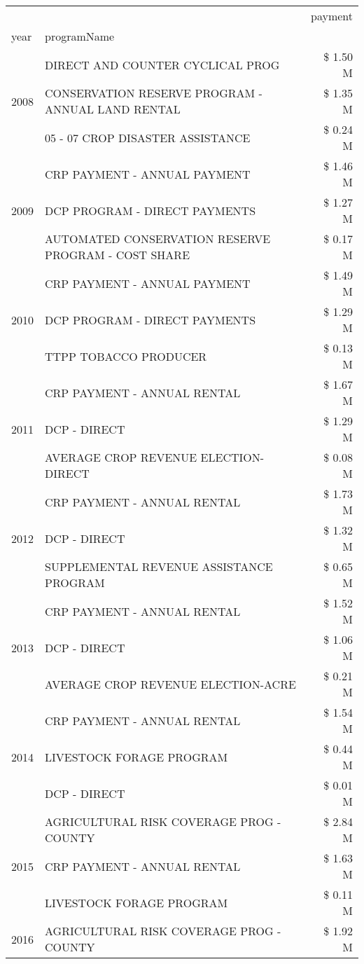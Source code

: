 \begin{tabular}{llr}
\toprule
 &  & payment \\
year & programName &  \\
\midrule
\multirow[t]{3}{*}{2008} & DIRECT AND COUNTER CYCLICAL PROG & \$ 1.50 M \\
 & CONSERVATION RESERVE PROGRAM - ANNUAL LAND RENTAL & \$ 1.35 M \\
 & 05 - 07 CROP DISASTER ASSISTANCE & \$ 0.24 M \\
\cline{1-3}
\multirow[t]{3}{*}{2009} & CRP PAYMENT - ANNUAL PAYMENT & \$ 1.46 M \\
 & DCP PROGRAM - DIRECT PAYMENTS & \$ 1.27 M \\
 & AUTOMATED CONSERVATION RESERVE PROGRAM - COST SHARE & \$ 0.17 M \\
\cline{1-3}
\multirow[t]{3}{*}{2010} & CRP PAYMENT - ANNUAL PAYMENT & \$ 1.49 M \\
 & DCP PROGRAM - DIRECT PAYMENTS & \$ 1.29 M \\
 & TTPP TOBACCO PRODUCER & \$ 0.13 M \\
\cline{1-3}
\multirow[t]{3}{*}{2011} & CRP PAYMENT - ANNUAL RENTAL & \$ 1.67 M \\
 & DCP - DIRECT & \$ 1.29 M \\
 & AVERAGE CROP REVENUE ELECTION-DIRECT & \$ 0.08 M \\
\cline{1-3}
\multirow[t]{3}{*}{2012} & CRP PAYMENT - ANNUAL RENTAL & \$ 1.73 M \\
 & DCP - DIRECT & \$ 1.32 M \\
 & SUPPLEMENTAL REVENUE ASSISTANCE PROGRAM & \$ 0.65 M \\
\cline{1-3}
\multirow[t]{3}{*}{2013} & CRP PAYMENT - ANNUAL RENTAL & \$ 1.52 M \\
 & DCP - DIRECT & \$ 1.06 M \\
 & AVERAGE CROP REVENUE ELECTION-ACRE & \$ 0.21 M \\
\cline{1-3}
\multirow[t]{3}{*}{2014} & CRP PAYMENT - ANNUAL RENTAL & \$ 1.54 M \\
 & LIVESTOCK FORAGE PROGRAM & \$ 0.44 M \\
 & DCP - DIRECT & \$ 0.01 M \\
\cline{1-3}
\multirow[t]{3}{*}{2015} & AGRICULTURAL RISK COVERAGE PROG - COUNTY & \$ 2.84 M \\
 & CRP PAYMENT - ANNUAL RENTAL & \$ 1.63 M \\
 & LIVESTOCK FORAGE PROGRAM & \$ 0.11 M \\
\cline{1-3}
\multirow[t]{3}{*}{2016} & AGRICULTURAL RISK COVERAGE PROG - COUNTY & \$ 1.92 M \\

\end{tabular}
